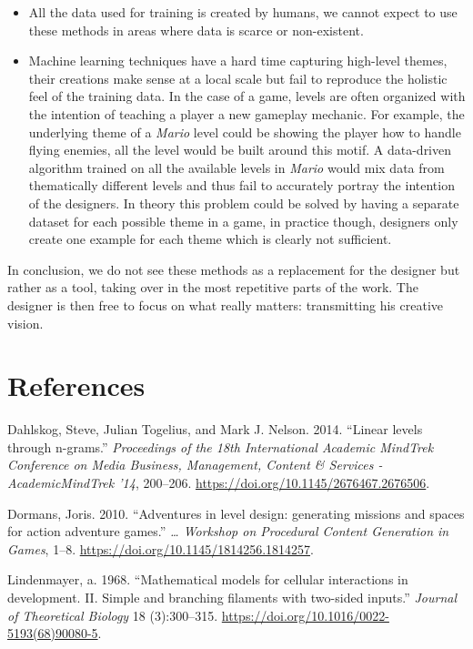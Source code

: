 \documentclass[A4paper,]{article}
\providecommand{\tightlist}{%
  \setlength{\itemsep}{0pt}\setlength{\parskip}{0pt}}
\begin{document}
\begin{itemize}
\tightlist
\item
  All the data used for training is created by humans, we cannot expect
  to use these methods in areas where data is scarce or non-existent.
\item
  Machine learning techniques have a hard time capturing high-level
  themes, their creations make sense at a local scale but fail to
  reproduce the holistic feel of the training data. In the case of a
  game, levels are often organized with the intention of teaching a
  player a new gameplay mechanic. For example, the underlying theme of a
  \emph{Mario} level could be showing the player how to handle flying
  enemies, all the level would be built around this motif. A data-driven
  algorithm trained on all the available levels in \emph{Mario} would
  mix data from thematically different levels and thus fail to
  accurately portray the intention of the designers. In theory this
  problem could be solved by having a separate dataset for each possible
  theme in a game, in practice though, designers only create one example
  for each theme which is clearly not sufficient.
\end{itemize}

In conclusion, we do not see these methods as a replacement for the
designer but rather as a tool, taking over in the most repetitive parts
of the work. The designer is then free to focus on what really matters:
transmitting his creative vision.

\section*{References}\label{references}

\hypertarget{refs}{}
\hypertarget{ref-Dahlskog2014}{}
Dahlskog, Steve, Julian Togelius, and Mark J. Nelson. 2014. ``Linear
levels through n-grams.'' \emph{Proceedings of the 18th International
Academic MindTrek Conference on Media Business, Management, Content \&
Services - AcademicMindTrek '14}, 200--206.
\url{https://doi.org/10.1145/2676467.2676506}.

\hypertarget{ref-Dormans2010}{}
Dormans, Joris. 2010. ``Adventures in level design: generating missions
and spaces for action adventure games.'' \emph{\ldots{} Workshop on
Procedural Content Generation in Games}, 1--8.
\url{https://doi.org/10.1145/1814256.1814257}.

\hypertarget{ref-Lindenmayer1968}{}
Lindenmayer, a. 1968. ``Mathematical models for cellular interactions in
development. II. Simple and branching filaments with two-sided inputs.''
\emph{Journal of Theoretical Biology} 18 (3):300--315.
\url{https://doi.org/10.1016/0022-5193(68)90080-5}.
\end{document}

